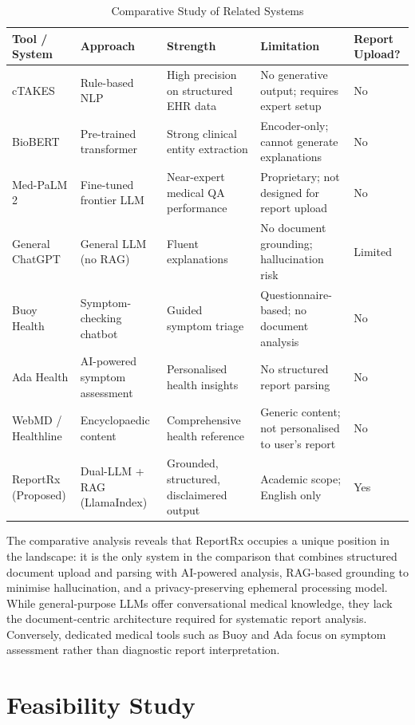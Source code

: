 \documentclass[12pt,a4paper]{report}
\begin{document}
\begin{table}[h]
\centering
\caption{Comparative Study of Related Systems}
\begin{tabular}{|p{1.9cm}|p{1.9cm}|p{2.2cm}|p{2.4cm}|p{1.6cm}|}
    \hline
    \textbf{Tool / System} & \textbf{Approach} & \textbf{Strength} & \textbf{Limitation} & \textbf{Report Upload?} \\
    \hline
    cTAKES & Rule-based NLP & High precision on structured EHR data & No generative output; requires expert setup & No \\
    BioBERT & Pre-trained transformer & Strong clinical entity extraction & Encoder-only; cannot generate explanations & No \\
    Med-PaLM 2 & Fine-tuned frontier LLM & Near-expert medical QA performance & Proprietary; not designed for report upload & No \\
    General ChatGPT & General LLM (no RAG) & Fluent explanations & No document grounding; hallucination risk & Limited \\
    Buoy Health & Symptom-checking chatbot & Guided symptom triage & Questionnaire-based; no document analysis & No \\
    Ada Health & AI-powered symptom assessment & Personalised health insights & No structured report parsing & No \\
    WebMD / Healthline & Encyclopaedic content & Comprehensive health reference & Generic content; not personalised to user's report & No \\
    ReportRx (Proposed) & Dual-LLM + RAG (LlamaIndex) & Grounded, structured, disclaimered output & Academic scope; English only & Yes \\
    \hline
\end{tabular}
\end{table}

The comparative analysis reveals that ReportRx occupies a unique position in the landscape: it is the only system in the comparison that combines structured document upload and parsing with AI-powered analysis, RAG-based grounding to minimise hallucination, and a privacy-preserving ephemeral processing model. While general-purpose LLMs offer conversational medical knowledge, they lack the document-centric architecture required for systematic report analysis. Conversely, dedicated medical tools such as Buoy and Ada focus on symptom assessment rather than diagnostic report interpretation.

\section{Feasibility Study}
\end{document}
